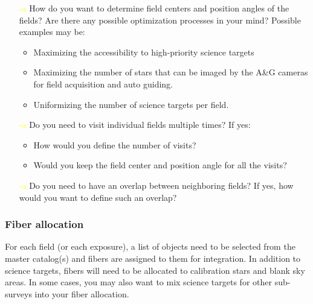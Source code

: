 \documentclass[a4paper,notitlepage]{article}
\newcommand{\colm}[1]{\textcolor{yellow}{\thesubsubsection-#1}}
\begin{document}
\begin{enumerate}
 \item[\colm{a}] How do you want to determine field centers and position
          angles of the fields? Are there any possible optimization
          processes in your mind? Possible examples may be:
          \begin{itemize}
           \item Maximizing the accessibility to high-priority
             science targets
           \item Maximizing the number of stars that can be imaged
             by the A\&G cameras for field acquisition and auto
             guiding.
           \item Uniformizing the number of science targets per
             field.
          \end{itemize}
 \item[\colm{a}] Do you need to visit individual fields multiple times?
          If yes:
          \begin{itemize}
           \item How would you define the number of visits?
           \item Would you keep the field center and position angle
             for all the visits?
          \end{itemize}
 \item[\colm{a}] Do you need to have an overlap between neighboring
          fields? If yes, how would you want to define such an
          overlap?
\end{enumerate}

\subsubsection{Fiber allocation}

For each field (or each exposure), a list of objects need to be selected
from the master catalog(s) and fibers are assigned to them for
integration. In addition to science targets, fibers will need to be
allocated to calibration stars and blank sky areas. In some cases, you
may also want to mix science targets for other sub-surveys into your
fiber allocation.
\end{document}
